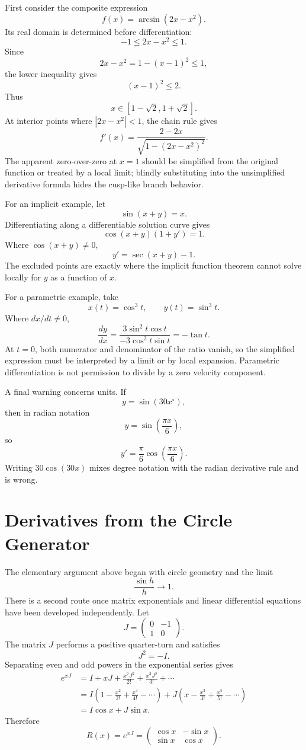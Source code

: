 First consider the composite expression
\[
  f(x)=\arcsin(2x-x^2).
\]
Its real domain is determined before differentiation:
\[
  -1\le2x-x^2\le1.
\]
Since
\[
  2x-x^2=1-(x-1)^2\le1,
\]
the lower inequality gives
\[
  (x-1)^2\le2.
\]
Thus
\[
  x\in[1-\sqrt2,1+\sqrt2].
\]
At interior points where \(|2x-x^2|<1\), the chain rule gives
\[
  f'(x)
  =\frac{2-2x}{\sqrt{1-(2x-x^2)^2}}.
\]
The apparent zero-over-zero at \(x=1\) should be simplified from the original function or treated by a local limit; blindly substituting into the unsimplified derivative formula hides the cusp-like branch behavior.

For an implicit example, let
\[
  \sin(x+y)=x.
\]
Differentiating along a differentiable solution curve gives
\[
  \cos(x+y)(1+y')=1.
\]
Where \(\cos(x+y)\ne0\),
\[
  y'=\sec(x+y)-1.
\]
The excluded points are exactly where the implicit function theorem cannot solve locally for \(y\) as a function of \(x\).

For a parametric example, take
\[
  x(t)=\cos^3t,
  \qquad
  y(t)=\sin^3t.
\]
Where \(dx/dt\ne0\),
\[
  \frac{dy}{dx}
  =\frac{3\sin^2t\cos t}{-3\cos^2t\sin t}
  =-\tan t.
\]
At \(t=0\), both numerator and denominator of the ratio vanish, so the simplified expression must be interpreted by a limit or by local expansion.  Parametric differentiation is not permission to divide by a zero velocity component.

A final warning concerns units.  If
\[
  y=\sin(30x^\circ),
\]
then in radian notation
\[
  y=\sin\left(\frac{\pi x}{6}\right),
\]
so
\[
  y'=\frac\pi6\cos\left(\frac{\pi x}{6}\right).
\]
Writing \(30\cos(30x)\) mixes degree notation with the radian derivative rule and is wrong.

\section{Derivatives from the Circle Generator}

The elementary argument above began with circle geometry and the limit
\[
  \frac{\sin h}{h}\longrightarrow1.
\]
There is a second route once matrix exponentials and linear differential equations have been developed independently.  Let
\[
  J=
  \begin{pmatrix}
    0&-1\\
    1&0
  \end{pmatrix}.
\]
The matrix \(J\) performs a positive quarter-turn and satisfies
\[
  J^2=-I.
\]
Separating even and odd powers in the exponential series gives
\[
\begin{aligned}
  e^{xJ}
  &=I+xJ+\frac{x^2J^2}{2!}+\frac{x^3J^3}{3!}+\cdots\\
  &=I\left(1-\frac{x^2}{2!}+\frac{x^4}{4!}-\cdots\right)
   +J\left(x-\frac{x^3}{3!}+\frac{x^5}{5!}-\cdots\right)\\
  &=I\cos x+J\sin x.
\end{aligned}
\]
Therefore
\[
  R(x)=e^{xJ}
  =
  \begin{pmatrix}
    \cos x&-\sin x\\
    \sin x&\cos x
  \end{pmatrix}.
\]


